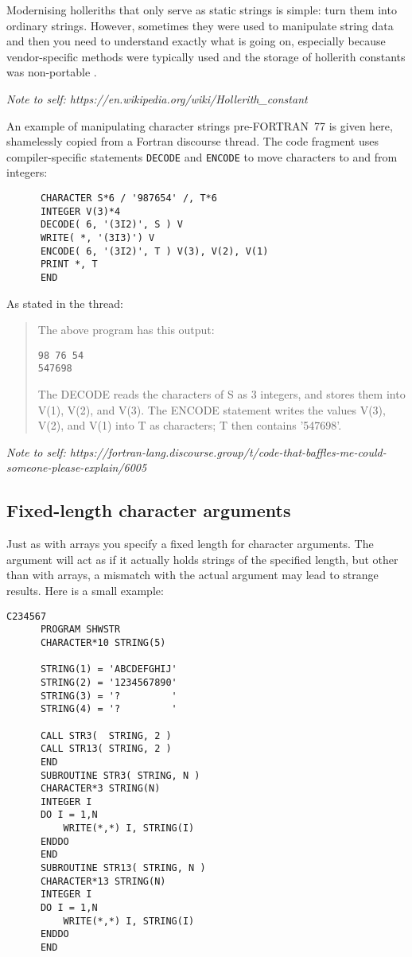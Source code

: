Modernising holleriths that only serve as static strings is simple: turn them into ordinary
strings. However, sometimes they were used to manipulate string data and then you need
to understand exactly what is going on, especially because vendor-specific methods were
typically used and the storage of hollerith constants was non-portable \cite{hollerith}.

\emph{Note to self: https://en.wikipedia.org/wiki/Hollerith\_constant}

An example of manipulating character strings pre-FORTRAN~77 is given here, shamelessly
copied from a Fortran discourse thread. The code fragment uses compiler-specific
statements \verb+DECODE+ and \verb+ENCODE+ to move characters to and from integers:
\begin{verbatim}
      CHARACTER S*6 / '987654' /, T*6
      INTEGER V(3)*4
      DECODE( 6, '(3I2)', S ) V
      WRITE( *, '(3I3)') V
      ENCODE( 6, '(3I2)', T ) V(3), V(2), V(1)
      PRINT *, T
      END
\end{verbatim}

As stated in the thread:
\begin{quote}
The above program has this output:

\begin{verbatim}
98 76 54
547698
\end{verbatim}

The DECODE reads the characters of S as 3 integers, and stores them into V(1), V(2), and V(3).
The ENCODE statement writes the values V(3), V(2), and V(1) into T as characters; T then contains '547698'.
\end{quote}


\emph{Note to self: https://fortran-lang.discourse.group/t/code-that-baffles-me-could-someone-please-explain/6005}


\subsection{Fixed-length character arguments}
Just as with arrays you specify a fixed length for character arguments. The argument will act as if it actually
holds strings of the specified length, but other than with arrays, a mismatch with the actual argument may lead
to strange results. Here is a small example:
\begin{verbatim}
C234567
      PROGRAM SHWSTR
      CHARACTER*10 STRING(5)

      STRING(1) = 'ABCDEFGHIJ'
      STRING(2) = '1234567890'
      STRING(3) = '?         '
      STRING(4) = '?         '

      CALL STR3(  STRING, 2 )
      CALL STR13( STRING, 2 )
      END
      SUBROUTINE STR3( STRING, N )
      CHARACTER*3 STRING(N)
      INTEGER I
      DO I = 1,N
          WRITE(*,*) I, STRING(I)
      ENDDO
      END
      SUBROUTINE STR13( STRING, N )
      CHARACTER*13 STRING(N)
      INTEGER I
      DO I = 1,N
          WRITE(*,*) I, STRING(I)
      ENDDO
      END
\end{verbatim}


